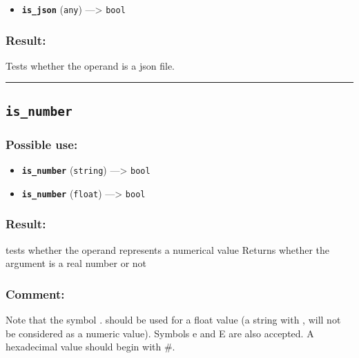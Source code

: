 \documentclass[]{book}
\providecommand{\tightlist}{%
  \setlength{\itemsep}{0pt}\setlength{\parskip}{0pt}}
\theoremstyle{definition}
\theoremstyle{definition}
\theoremstyle{definition}
\theoremstyle{remark}
\begin{document}
\begin{itemize}
\tightlist
\item
  \textbf{\texttt{is\_json}} (\texttt{any}) ---\textgreater{}
  \texttt{bool}
\end{itemize}

\subsubsection{Result:}\label{result-285}

Tests whether the operand is a json file.

\begin{center}\rule{0.5\linewidth}{\linethickness}\end{center}

\subsection{\texorpdfstring{\texttt{is\_number}}{is\_number}}\label{is_number}

\subsubsection{Possible use:}\label{possible-use-296}

\begin{itemize}
\tightlist
\item
  \textbf{\texttt{is\_number}} (\texttt{string}) ---\textgreater{}
  \texttt{bool}
\item
  \textbf{\texttt{is\_number}} (\texttt{float}) ---\textgreater{}
  \texttt{bool}
\end{itemize}

\subsubsection{Result:}\label{result-286}

tests whether the operand represents a numerical value Returns whether
the argument is a real number or not

\subsubsection{Comment:}\label{comment-55}

Note that the symbol . should be used for a float value (a string with ,
will not be considered as a numeric value). Symbols e and E are also
accepted. A hexadecimal value should begin with \#.
\end{document}
